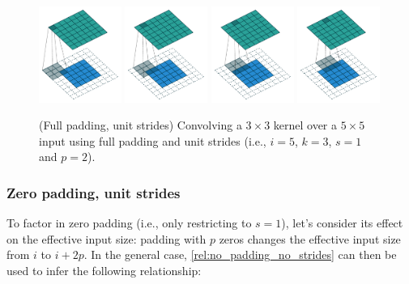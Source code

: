 \begin{figure}[p]
    \centering
    \includegraphics[width=0.24\textwidth]{pdf/full_padding_no_strides_00.pdf}
    \includegraphics[width=0.24\textwidth]{pdf/full_padding_no_strides_01.pdf}
    \includegraphics[width=0.24\textwidth]{pdf/full_padding_no_strides_02.pdf}
    \includegraphics[width=0.24\textwidth]{pdf/full_padding_no_strides_03.pdf}
    \caption{\label{fig:full_padding_no_strides} (Full padding, unit strides)
        Convolving a $3 \times 3$ kernel over a $5 \times 5$ input using full
        padding and unit strides (i.e., $i = 5$, $k = 3$, $s = 1$ and $p = 2$).}
\end{figure}

\subsubsection{Zero padding, unit strides}

To factor in zero padding (i.e., only restricting to $s = 1$), let's consider
its effect on the effective input size: padding with $p$ zeros changes the
effective input size from $i$ to $i + 2p$. In the general case,
\autoref{rel:no_padding_no_strides} can then be used to infer the following
relationship:

